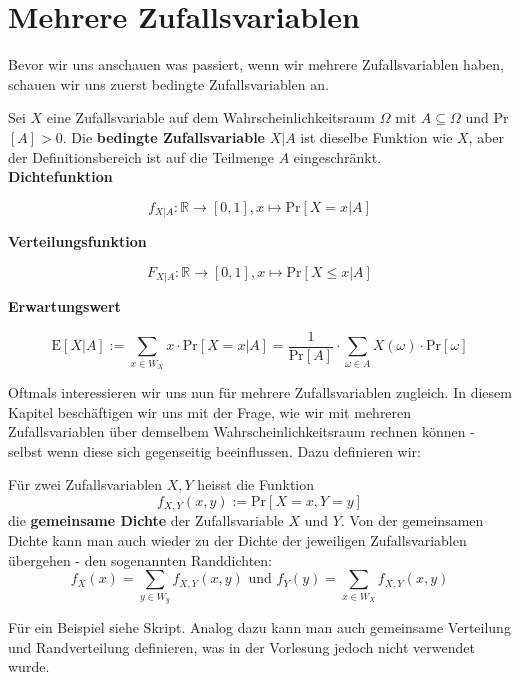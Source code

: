 \chapter{Mehrere Zufallsvariablen}

Bevor wir uns anschauen was passiert, wenn wir mehrere Zufallsvariablen haben, schauen wir uns 
zuerst bedingte Zufallsvariablen an.

\begin{definition}
    Sei $X$ eine Zufallsvariable auf dem Wahrscheinlichkeitsraum $\Omega$ mit $A \subseteq \Omega$
    und Pr$[A] > 0$. Die \textbf{bedingte Zufallsvariable} $X | A$ ist dieselbe Funktion wie $X$,
    aber der Definitionsbereich ist auf die Teilmenge $A$ eingeschränkt. \\

    \textbf{Dichtefunktion}

    $$f_{X | A}: \mathbb{R} \rightarrow [0, 1], x \mapsto \text{Pr}[X = x | A]$$

    \textbf{Verteilungsfunktion}

    $$F_{X | A}: \mathbb{R} \rightarrow [0, 1], x \mapsto \text{Pr}[X \leq x | A]$$

    \textbf{Erwartungswert}

    $$\text{E}[X | A] := \sum_{x \in W_X} x \cdot \text{Pr}[X = x | A] = \frac{1}{\text{Pr}[A]} \cdot \sum_{\omega \in A} X(\omega) \cdot \text{Pr}[\omega]$$

\end{definition}
\bigskip

Oftmals interessieren wir uns nun für mehrere Zufallsvariablen zugleich. In diesem Kapitel beschäftigen 
wir uns mit der Frage, wie wir mit mehreren Zufallsvariablen über demselbem Wahrscheinlichkeitsraum rechnen 
können - selbst wenn diese sich gegenseitig beeinflussen. Dazu definieren wir:

\begin{definition}
    Für zwei Zufallsvariablen $X, Y$ heisst die Funktion
    $$f_{X,Y}(x, y) := \text{Pr}[X = x, Y = y]$$
    die \textbf{gemeinsame Dichte} der Zufallsvariable $X$ und $Y$. Von der gemeinsamen Dichte kann man
    auch wieder zu der Dichte der jeweiligen Zufallsvariablen übergehen - den sogenannten Randdichten:
    $$f_X(x) = \sum_{y \in W_y} f_{X,Y}(x,y) \text{   und   } f_Y(y) = \sum_{x \in W_X} f_{X,Y}(x,y)$$
\end{definition}
\bigskip

Für ein Beispiel siehe Skript. Analog dazu kann man auch gemeinsame Verteilung und Randverteilung definieren, 
was in der Vorlesung jedoch nicht verwendet wurde.


